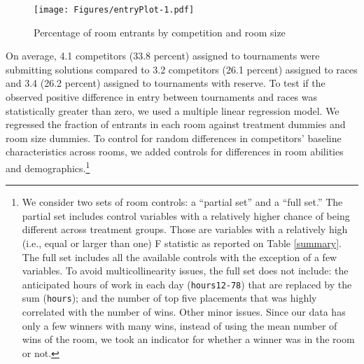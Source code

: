 \documentclass[11pt, titlepage]{article}
\begin{document}
\begin{figure}
\caption{Percentage of room entrants by competition and room size}
\label{room entrants}
\texttt{[image: Figures/entryPlot-1.pdf]}
\end{figure}

On average, 4.1 competitors (33.8 percent) assigned to tournaments were
submitting solutions compared to 3.2 competitors (26.1 percent) assigned
to races and 3.4 (26.2 percent) assigned to tournaments with reserve. To
test if the observed positive difference in entry between tournaments
and races was statistically greater than zero, we used a multiple linear
regression model. We regressed the fraction of entrants in each room
against treatment dummies and room size dummies. To control for random
differences in competitors' baseline characteristics across rooms, we
added controls for differences in room abilities and
demographics.\footnote{We consider two sets of room controls: a
  ``partial set'' and a ``full set.'' The partial set includes control
  variables with a relatively higher chance of being different across
  treatment groups. Those are variables with a relatively high (i.e.,
  equal or larger than one) F statistic as reported on Table
  \ref{summary}. The full set includes all the available controls with
  the exception of a few variables. To avoid multicollinearity issues,
  the full set does not include: the anticipated hours of work in each
  day (\texttt{hours12-78}) that are replaced by the sum
  (\texttt{hours}); and the number of top five placements that was
  highly correlated with the number of wins. Other minor issues. Since
  our data has only a few winners with many wins, instead of using the
  mean number of wins of the room, we took an indicator for whether a
  winner was in the room or not.}
\end{document}

